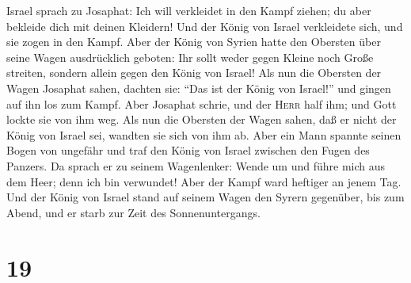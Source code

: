 Israel sprach zu Josaphat: Ich will verkleidet in den Kampf ziehen; du
aber bekleide dich mit deinen Kleidern! Und der König von Israel
verkleidete sich, und sie zogen in den Kampf.  Aber der
König von Syrien hatte den Obersten über seine Wagen ausdrücklich
geboten: Ihr sollt weder gegen Kleine noch Große streiten, sondern
allein gegen den König von Israel!  Als nun die Obersten
der Wagen Josaphat sahen, dachten sie: ``Das ist der König von Israel!''
und gingen auf ihn los zum Kampf. Aber Josaphat schrie, und der
\textsc{Herr} half ihm; und Gott lockte sie von ihm weg. 
Als nun die Obersten der Wagen sahen, daß er nicht der König von Israel
sei, wandten sie sich von ihm ab.  Aber ein Mann spannte
seinen Bogen von ungefähr und traf den König von Israel zwischen den
Fugen des Panzers. Da sprach er zu seinem Wagenlenker: Wende um und
führe mich aus dem Heer; denn ich bin verwundet!  Aber
der Kampf ward heftiger an jenem Tag. Und der König von Israel stand auf
seinem Wagen den Syrern gegenüber, bis zum Abend, und er starb zur Zeit
des Sonnenuntergangs.

\hypertarget{section-18}{%
\section{19}\label{section-18}}

